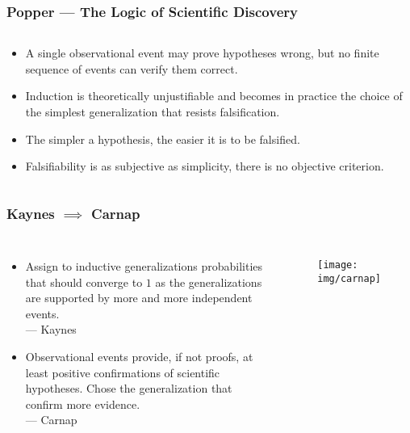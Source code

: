 \documentclass[UTF8,11pt,colorlinks,compress,openany]{beamer}%
\begin{document}
\begin{frame}\frametitle{Popper --- The Logic of Scientific Discovery}
	\begin{columns}[onlytextwidth]
			\begin{proposition}[Popper]
				\begin{itemize}
					\item A single observational event may prove hypotheses wrong, but no finite sequence of events can verify them correct. 
					\item Induction is theoretically unjustifiable and becomes in practice the choice of the simplest generalization that resists falsification.
					\item The simpler a hypothesis, the easier it is to be falsified.
					\item Falsifiability is as subjective as simplicity, there is no objective criterion.
				\end{itemize}
			\end{proposition}
	\end{columns}	
\end{frame}

\begin{frame}\frametitle{Kaynes $\implies$ Carnap}
	\begin{columns}
			\begin{itemize}
				\item Assign to inductive generalizations probabilities that should converge to $1$ as the generalizations are supported by more and more independent events.\\
				\hfill --- Kaynes
				\item Observational events provide, if not proofs, at least positive confirmations of scientific hypotheses. Chose the generalization that confirm more evidence.\\
				\hfill --- Carnap
			\end{itemize}
			\begin{figure}
				\texttt{[image: img/carnap]}
			\end{figure}
	\end{columns}
\end{frame}
\end{document}
